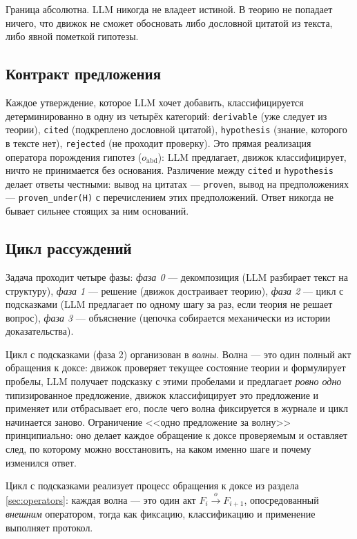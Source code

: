\documentclass[12pt,a4paper]{article}
\begin{document}
Граница абсолютна. LLM никогда не владеет истиной. В теорию не попадает ничего, что движок не сможет
обосновать либо дословной цитатой из текста, либо явной пометкой гипотезы.

\subsection{Контракт предложения}
\label{sec:contract}

Каждое утверждение, которое LLM хочет добавить, классифицируется детерминированно в одну из четырёх
категорий: \texttt{derivable} (уже следует из теории), \texttt{cited} (подкреплено дословной цитатой),
\texttt{hypothesis} (знание, которого в тексте нет), \texttt{rejected} (не проходит проверку).
Это прямая реализация оператора порождения гипотез ($o_{\text{abd}}$): LLM предлагает, движок классифицирует,
ничто не принимается без основания. Различение между \texttt{cited} и \texttt{hypothesis} делает ответы
честными: вывод на цитатах --- \texttt{proven}, вывод на предположениях --- \texttt{proven\_under(H)}
с перечислением этих предположений. Ответ никогда не бывает сильнее стоящих за ним оснований.

\subsection{Цикл рассуждений}
\label{sec:cycle}

Задача проходит четыре фазы: \emph{фаза 0} --- декомпозиция (LLM разбирает текст на структуру),
\emph{фаза 1} --- решение (движок достраивает теорию), \emph{фаза 2} --- цикл с подсказками
(LLM предлагает по одному шагу за раз, если теория не решает вопрос), \emph{фаза 3} ---
объяснение (цепочка собирается механически из истории доказательства).

Цикл с подсказками (фаза 2) организован в \emph{волны}. Волна --- это один полный акт обращения
к доксе: движок проверяет текущее состояние теории и формулирует пробелы, LLM получает подсказку
с этими пробелами и предлагает \emph{ровно одно} типизированное предложение, движок классифицирует
это предложение и применяет или отбрасывает его, после чего волна фиксируется в журнале и цикл
начинается заново. Ограничение <<одно предложение за волну>> принципиально: оно делает каждое
обращение к доксе проверяемым и оставляет след, по которому можно восстановить, на каком именно
шаге и почему изменился ответ.

Цикл с подсказками реализует процесс обращения к доксе из раздела \ref{sec:operators}: каждая волна --- это один
акт $F_i \xrightarrow{o} F_{i+1}$, опосредованный \emph{внешним} оператором, тогда как фиксацию,
классификацию и применение выполняет протокол.
\end{document}
